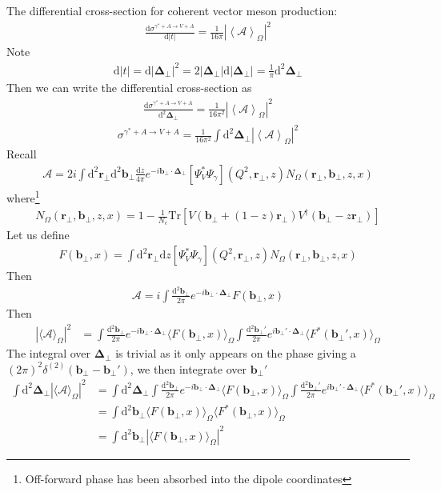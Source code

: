 \documentclass[prd,superscriptaddress,floatfix,nopacs,preprintnumbers,nofootinbib]{revtex4-2}
\newcommand{\Deltat}{\boldsymbol{\Delta}_{\perp}}
\newcommand{\vect}[1]{\boldsymbol{#1}_{\perp}}
\newcommand{\Dt}{\vect{\Delta}}
\newcommand{\bt}{\vect{b}}
\newcommand{\rt}{\vect{r}}
\newcommand{\der}{\mathrm{d}}
\newcommand{\Tr}{\mathrm{Tr}}
\begin{document}


The differential cross-section for coherent vector meson production:
\begin{align}
    \frac{\der \sigma^{\gamma^* + A \to V + A}}{\der |t|}  = \frac{1}{16\pi} \left|\left\langle \mathcal{A} \right\rangle_\Omega\right|^2
\end{align}
Note
\begin{align}
    \der |t| = \der |\Deltat|^2 = 2 |\Deltat| \der |\Deltat| = \frac{1}{\pi}\der^2 \Deltat
\end{align}
Then we can write the differential cross-section as
\begin{align}
    \frac{\der \sigma^{\gamma^* + A \to V + A}}{\der^2 \Deltat}  = \frac{1}{16\pi^2} \left|\left\langle \mathcal{A} \right\rangle_\Omega\right|^2
\end{align}
\begin{align}
    \sigma^{\gamma^* + A \to V + A}  = \frac{1}{16\pi^2} \int \der^2 \Deltat \left|\left\langle \mathcal{A} \right\rangle_\Omega\right|^2
\end{align}
Recall
\begin{align}
    \mathcal{A} = 2i\int \der^2 {\rt} \der^2 \bt  \frac{\der z}{4\pi} e^{-i \bt \cdot \Deltat} [\Psi_V^* \Psi_\gamma] (Q^2,\rt,z) N_\Omega(\rt,\bt,z,x)
\end{align}
where\footnote{Off-forward phase has been absorbed into the dipole coordinates}
\begin{align}
    N_\Omega(\rt,\bt,z,x) = 1-\frac{1}{N_c} \Tr\left[V(\bt + (1-z)\rt) V^\dagger(\bt - z\rt) \right]
\end{align}
Let us define
\begin{align}
    F(\bt,x) = \int \der^2 {\rt} \der z   [\Psi_V^* \Psi_\gamma] (Q^2,\rt,z) N_\Omega(\rt,\bt,z,x) 
\end{align}
Then
\begin{align}
    \mathcal{A} = i \int \frac{\der^2 \bt}  {2\pi} e^{-i \bt \cdot \Deltat} F(\bt,x)
\end{align}
Then
\begin{align}
    |\langle \mathcal{A} \rangle_{\Omega}|^2 &= \int \frac{\der^2 \bt}  {2\pi} e^{-i \bt \cdot \Deltat} \langle F(\bt,x) \rangle_{\Omega} \int \frac{\der^2 \bt'}  {2\pi} e^{i \bt' \cdot \Deltat} \langle F^{*}(\bt',x) \rangle_{\Omega}
\end{align}
The integral over $\Dt$ is trivial as it only appears on the phase giving a $(2\pi)^2\delta^{(2)}(\bt-\bt')$, we then integrate over $\bt'$
\begin{align}
    \int \der^2 \Dt |\langle \mathcal{A} \rangle_{\Omega}|^2 &= \int \der^2 \Dt 
 \int \frac{\der^2 \bt}  {2\pi} e^{-i \bt \cdot \Deltat} \langle F(\bt,x) \rangle_{\Omega} \int \frac{\der^2 \bt'}  {2\pi} e^{i \bt' \cdot \Deltat} \langle F^{*}(\bt',x) \rangle_{\Omega} \\
 & =  \int \der^2 \bt \langle F(\bt,x) \rangle_{\Omega} \langle F^{*}(\bt,x) \rangle_{\Omega} \nonumber \\
 & = \int \der^2 \bt |\langle F(\bt,x) \rangle_{\Omega}|^2
\end{align}
\end{document}
